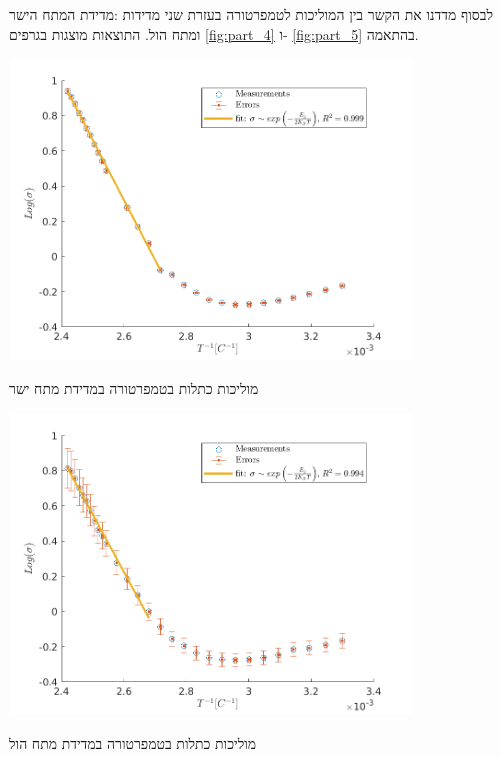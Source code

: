 \documentclass{article}
\begin{document}
לבסוף מדדנו את הקשר בין המוליכות לטמפרטורה בעזרת שני מדידות :מדידת המתח הישר ומתח הול.
התוצאות מוצגות בגרפים
\ref{fig:part_4}
ו-
\ref{fig:part_5}
בהתאמה.

\begin{graph}[ht!]
    \centering
    \includegraphics[width=0.8\textwidth]{part4 - E_g.png}
    \caption{מוליכות כתלות בטמפרטורה במדידת מתח ישר}
    \label{fig:part_4}
\end{graph}

\begin{graph}[ht!]
    \centering
    \includegraphics[width=0.8\textwidth]{part5 - E_g with magnetic field.png}
    \caption{מוליכות כתלות בטמפרטורה במדידת מתח הול}
    \label{fig:part_5}
\end{graph}
\end{document}
